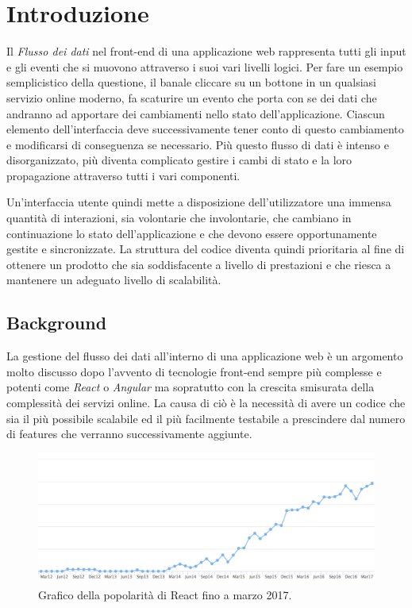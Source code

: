 \chapter{Introduzione}
Il \textit{Flusso dei dati} nel front-end di una applicazione web rappresenta tutti gli input e gli eventi che si muovono attraverso i suoi vari livelli logici. Per fare un esempio semplicistico della questione, il banale cliccare su un bottone in un qualsiasi servizio online moderno, fa scaturire un evento che porta con se dei dati che andranno ad apportare dei cambiamenti nello stato dell'applicazione. Ciascun elemento dell'interfaccia deve successivamente tener conto di questo cambiamento e modificarsi di conseguenza se necessario. Più questo flusso di dati è intenso e disorganizzato, più diventa complicato gestire i cambi di stato e la loro propagazione attraverso tutti i vari componenti.

Un'interfaccia utente quindi mette a disposizione dell'utilizzatore una immensa quantità di interazioni, sia volontarie che involontarie, che cambiano in continuazione lo stato dell'applicazione e che devono essere opportunamente gestite e sincronizzate. La struttura del codice diventa quindi prioritaria al fine di ottenere un prodotto che sia soddisfacente a livello di prestazioni e che riesca a mantenere un adeguato livello di scalabilità.

\section{Background}
La gestione del flusso dei dati all'interno di una applicazione web è un argomento molto discusso dopo l'avvento di tecnologie front-end sempre più complesse e potenti come \textit{React} o \textit{Angular} ma sopratutto con la crescita smisurata della complessità dei servizi online. La causa di ciò è la necessità di avere un codice che sia il più possibile scalabile ed il più facilmente testabile a prescindere dal numero di features che verranno successivamente aggiunte. 

\begin{figure}[h]
\centering 
\includegraphics[width=12.7cm]{./images/reactPopularity}
\caption{Grafico della popolarità di React fino a marzo 2017.}
\end{figure}

